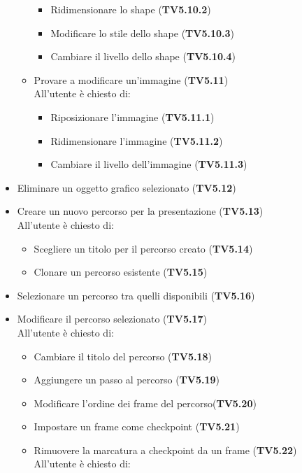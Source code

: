 \begin{itemize}
\begin{itemize}
\begin{itemize}
		 	\item Ridimensionare lo shape (\textbf{TV5.10.2})
		 	\item Modificare lo stile dello shape (\textbf{TV5.10.3})
		 	\item Cambiare il livello dello shape (\textbf{TV5.10.4})
		 \end{itemize}
		 \item Provare a modificare un'immagine (\textbf{TV5.11})\\
		 All'utente è chiesto di:
		 \begin{itemize}
		 	\item Riposizionare l'immagine (\textbf{TV5.11.1})
		 	\item Ridimensionare l'immagine (\textbf{TV5.11.2})
		 	\item Cambiare il livello dell'immagine (\textbf{TV5.11.3})
		 \end{itemize}
    \end{itemize}
    \item Eliminare un oggetto grafico selezionato (\textbf{TV5.12})
    \item Creare un nuovo percorso per la presentazione (\textbf{TV5.13})\\
    All'utente è chiesto di:
    \begin{itemize}
    	\item Scegliere un titolo per il percorso creato (\textbf{TV5.14})
    	\item Clonare un percorso esistente (\textbf{TV5.15})
    \end{itemize}
    \item Selezionare un percorso tra quelli disponibili (\textbf{TV5.16})
    \item Modificare il percorso selezionato (\textbf{TV5.17})\\
    All'utente è chiesto di:
    \begin{itemize}
    	\item Cambiare il titolo del percorso (\textbf{TV5.18})
    	\item Aggiungere un passo al percorso (\textbf{TV5.19})
    	\item Modificare l'ordine dei frame del percorso(\textbf{TV5.20})
    	\item Impostare un frame come checkpoint (\textbf{TV5.21})
    	\item Rimuovere la marcatura a checkpoint da un frame (\textbf{TV5.22})\\
    	 All'utente è chiesto di:
    	     \begin{itemize}

\end{itemize}
\end{itemize}
\end{itemize}
